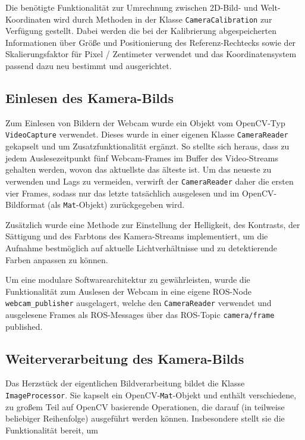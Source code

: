Die ben\"otigte Funktionalit\"at zur Umrechnung zwischen 2D-Bild- und Welt-Koordinaten wird durch
Methoden in der Klasse \texttt{CameraCalibration} zur Verf\"ugung gestellt. Dabei werden die bei der Kalibrierung
abgespeicherten Informationen \"uber Gr\"o\ss e und Positionierung des Referenz-Rechtecks sowie der
Skalierungsfaktor f\"ur Pixel / Zentimeter verwendet
und das Koordinatensystem passend dazu neu bestimmt und ausgerichtet.\\

\subsection{Einlesen des Kamera-Bilds}

Zum Einlesen von Bildern der Webcam wurde ein Objekt vom OpenCV-Typ \texttt{VideoCapture} verwendet.
Dieses wurde in einer eigenen Klasse \texttt{CameraReader} gekapselt und um Zusatzfunktionalit\"at
erg\"anzt. So stellte sich heraus, dass zu jedem Auslesezeitpunkt f\"unf Webcam-Frames im Buffer des
Video-Streams gehalten werden, wovon das aktuellste das \"alteste ist. Um das neueste zu verwenden
und Lags zu vermeiden, verwirft der \texttt{CameraReader} daher die ersten vier Frames, sodass nur das letzte
tats\"achlich ausgelesen und im OpenCV-Bildformat (als \texttt{Mat}-Objekt) zur\"uckgegeben wird.

Zus\"atzlich wurde eine Methode zur Einstellung der Helligkeit, des Kontrasts, der S\"attigung und des
Farbtons des Kamera-Streams implementiert, um die Aufnahme bestm\"oglich auf aktuelle Lichtverh\"altnisse und zu
detektierende Farben anpassen zu k\"onnen.

Um eine modulare Softwarearchitektur zu gew\"ahrleisten, wurde die Funktionalit\"at zum Auslesen der Webcam
in eine eigene ROS-Node \texttt{webcam\_publisher} ausgelagert, welche den
\texttt{CameraReader} verwendet und ausgelesene Frames als ROS-Messages \"uber das ROS-Topic
\texttt{camera/frame} published.

\subsection{Weiterverarbeitung des Kamera-Bilds}

Das Herzst\"uck der eigentlichen Bildverarbeitung bildet die Klasse \texttt{ImageProcessor}. Sie kapselt
ein OpenCV-\texttt{Mat}-Objekt und enth\"alt verschiedene, zu gro\ss em Teil auf OpenCV basierende
Operationen, die darauf (in teilweise beliebiger
Reihenfolge) ausgef\"uhrt werden k\"onnen. Insbesondere stellt sie die Funktionalit\"at bereit, um

